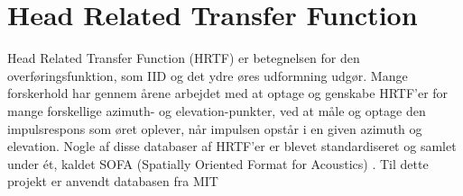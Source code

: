 \section{Head Related Transfer Function}
\label{sec:HRTF}

Head Related Transfer Function (HRTF) er betegnelsen for den overføringsfunktion, som IID og det ydre øres udformning udgør. Mange forskerhold har gennem årene arbejdet med at optage og genskabe HRTF'er for mange forskellige azimuth- og elevation-punkter, ved at måle og optage den impulsrespons som øret oplever, når impulsen opstår i en given azimuth og elevation. Nogle af disse databaser af HRTF'er er blevet standardiseret og samlet under ét, kaldet SOFA (Spatially Oriented Format for Acoustics) \cite{SOFA}. Til dette projekt er anvendt databasen fra MIT \cite{MIT} 